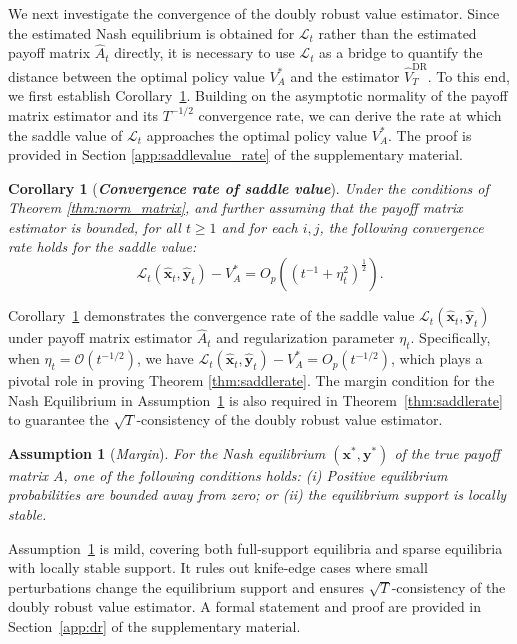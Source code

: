 \documentclass[12pt]{article}
\newtheorem{assumption}{Assumption}[section]
\newtheorem{corollary}[theorem]{Corollary}
\begin{document}
We next investigate the convergence of the doubly robust value estimator. Since the estimated Nash equilibrium is obtained for $\mathcal{L}_t$ rather than the estimated payoff matrix $\widehat{A}_t$ directly, it is necessary to use $\mathcal{L}_t$ as a bridge to quantify the distance between the optimal policy value $V_A^\ast$ and the estimator $\widehat{V}_T^{\text{DR}}$. To this end, we first establish Corollary~\ref{thm:NEvalue}. Building on the asymptotic normality of the payoff matrix estimator and its ${T}^{-1/2}$ convergence rate, we can derive the rate at which the saddle value of $\mathcal{L}_t$ approaches the optimal policy value $V_A^\ast$. The proof is provided in Section \ref{app:saddlevalue_rate} of the supplementary material.

\begin{corollary}[\textbf{{\emph{Convergence rate of saddle value}}}]
\label{thm:NEvalue}
Under the conditions of Theorem \ref{thm:norm_matrix}, and further assuming that the payoff matrix estimator is bounded, for all $t \ge 1$ and for each $i, j$, the following convergence rate holds for the saddle value:
$$\mathcal{L}_t(\widehat{\bm{x}}_t,\widehat{\bm{y}}_t) - V_A^\ast = O_p\left((t^{-1}+\eta_t^2)^{\frac{1}{2}}\right).$$
\end{corollary}


Corollary~\ref{thm:NEvalue} demonstrates the convergence rate of the saddle value $\mathcal{L}_t(\widehat{\bm{x}}_t,\widehat{\bm{y}}_t)$ under payoff matrix estimator $\widehat{A}_t$ and regularization parameter $\eta_t$. Specifically, when $\eta_t = \mathcal{O}(t^{-1/2})$, we have $\mathcal{L}_t(\widehat{\bm{x}}_t,\widehat{\bm{y}}_t) - V_A^\ast = O_p(t^{-1/2})$, which plays a pivotal role in proving Theorem \ref{thm:saddlerate}. 
The margin condition for the Nash Equilibrium in Assumption~\ref{ass:mix} is also required in Theorem~\ref{thm:saddlerate} to guarantee the $\sqrt{T}$-consistency of the doubly robust value estimator.


\begin{assumption}[{\emph{Margin}}] 
\label{ass:mix} 
For the Nash equilibrium $(\bm x^\ast,\bm y^\ast)$ of the true payoff matrix $A$, one of the following conditions holds: 
\textnormal{(i)} Positive equilibrium probabilities are bounded away from zero; or
\textnormal{(ii)} the equilibrium support is locally stable.
\end{assumption}

Assumption~\ref{ass:mix} is mild, covering both full-support equilibria and sparse equilibria with locally stable support. It rules out knife-edge cases where small perturbations change the equilibrium support and ensures $\sqrt{T}$-consistency of the doubly robust value estimator. A formal statement and proof are provided in Section~\ref{app:dr} of the supplementary material.
\end{document}
